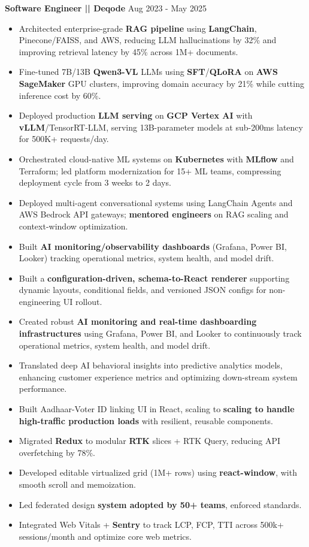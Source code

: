 \documentclass[a4paper]{article}
\begin{document}
\vspace{4pt}
\textbf{Software Engineer || Deqode}
\hfill Aug 2023 - May 2025
\begin{itemize}
\vspace{1pt}
\item {Architected enterprise-grade \textbf{RAG pipeline} using \textbf{LangChain}, Pinecone/FAISS, and AWS, reducing LLM hallucinations by 32\% and improving retrieval latency by 45\% across 1M+ documents.}
\item {Fine-tuned 7B/13B \textbf{Qwen3-VL} LLMs using \textbf{SFT}/\textbf{QLoRA} on \textbf{AWS SageMaker} GPU clusters, improving domain accuracy by 21\% while cutting inference cost by 60\%.}
\item {Deployed production \textbf{LLM serving} on \textbf{GCP Vertex AI} with \textbf{vLLM}/TensorRT-LLM, serving 13B-parameter models at sub-200ms latency for 500K+ requests/day.}
\item {Orchestrated cloud-native ML systems on \textbf{Kubernetes} with \textbf{MLflow} and Terraform; led platform modernization for 15+ ML teams, compressing deployment cycle from 3 weeks to 2 days.}
\item {Deployed multi-agent conversational systems using LangChain Agents and AWS Bedrock API gateways; \textbf{mentored engineers} on RAG scaling and context-window optimization.}
\item {Built \textbf{AI monitoring/observability dashboards} (Grafana, Power BI, Looker) tracking operational metrics, system health, and model drift.}
\item {Built a \textbf{configuration-driven, schema-to-React renderer} supporting dynamic layouts, conditional fields, and versioned JSON configs for non-engineering UI rollout.}
\item {Created robust \textbf{AI monitoring and real-time dashboarding infrastructures} using Grafana, Power BI, and Looker to continuously track operational metrics, system health, and model drift.}
\item {Translated deep AI behavioral insights into predictive analytics models, enhancing customer experience metrics and optimizing down-stream system performance.}
\item {Built Aadhaar-Voter ID linking UI in React, scaling to \textbf{scaling to handle high-traffic production loads} with resilient, reusable components.}
\item {Migrated \textbf{Redux} to modular \textbf{RTK} slices + RTK Query, reducing API overfetching by 78\%.}
\item {Developed editable virtualized grid (1M+ rows) using \textbf{react-window}, with smooth scroll and memoization.}
\item {Led federated design \textbf{system adopted by 50+ teams}, enforced standards.}
\item {Integrated Web Vitals + \textbf{Sentry} to track LCP, FCP, TTI across 500k+ sessions/month and optimize core web metrics.}

\end{itemize}
\end{document}
